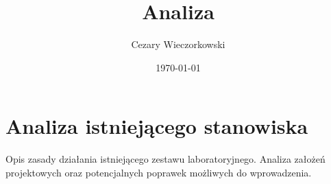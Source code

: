 \documentclass[../main.tex]{subfiles}
\author{Cezary Wieczorkowski}
\date{\today}
\title{Analiza}
\begin{document}
\section{Analiza istniejącego stanowiska}

Opis zasady działania istniejącego zestawu laboratoryjnego. Analiza założeń projektowych oraz potencjalnych poprawek możliwych do wprowadzenia.
\end{document}
